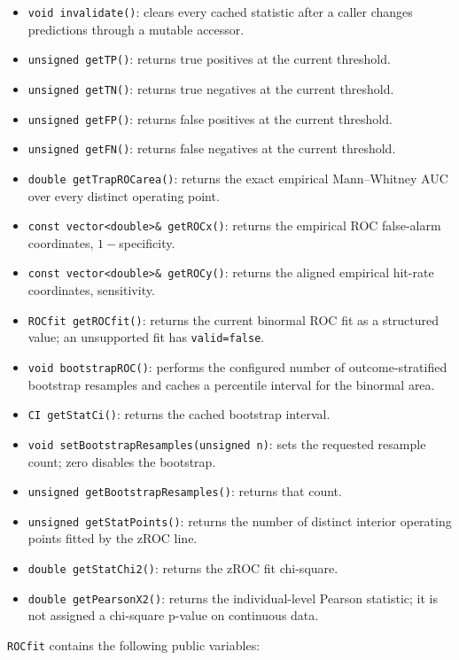 \begin{itemize}
\item \texttt{void invalidate()}: clears every cached statistic after a caller
      changes predictions through a mutable accessor.
\item \texttt{unsigned getTP()}: returns true positives at the current threshold.
\item \texttt{unsigned getTN()}: returns true negatives at the current threshold.
\item \texttt{unsigned getFP()}: returns false positives at the current threshold.
\item \texttt{unsigned getFN()}: returns false negatives at the current threshold.
\item \texttt{double getTrapROCarea()}: returns the exact empirical
      Mann--Whitney AUC over every distinct operating point.
\item \texttt{const vector<double>\& getROCx()}: returns the empirical ROC
      false-alarm coordinates, $1-$specificity.
\item \texttt{const vector<double>\& getROCy()}: returns the aligned empirical
      hit-rate coordinates, sensitivity.
\item \texttt{ROCfit getROCfit()}: returns the current binormal ROC fit as a
      structured value; an unsupported fit has \texttt{valid=false}.
\item \texttt{void bootstrapROC()}: performs the configured number of
      outcome-stratified bootstrap resamples and caches a percentile interval
      for the binormal area.
\item \texttt{CI getStatCi()}: returns the cached bootstrap interval.
\item \texttt{void setBootstrapResamples(unsigned n)}: sets the requested
      resample count; zero disables the bootstrap.
\item \texttt{unsigned getBootstrapResamples()}: returns that count.
\item \texttt{unsigned getStatPoints()}: returns the number of distinct
      interior operating points fitted by the zROC line.
\item \texttt{double getStatChi2()}: returns the zROC fit chi-square.
\item \texttt{double getPearsonX2()}: returns the individual-level Pearson
      statistic; it is not assigned a chi-square p-value on continuous data.
\end{itemize}

\texttt{ROCfit} contains the following public variables:

